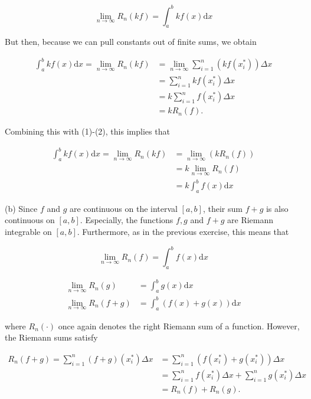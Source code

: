 \documentclass[10pt]{article}
\begin{document}
\begin{equation*}
\lim _{n \rightarrow \infty} R_{n}(k f)=\int_{a}^{b} k f(x) \mathrm{d} x \tag{2}
\end{equation*}


But then, because we can pull constants out of finite sums, we obtain

$$
\begin{aligned}
\int_{a}^{b} k f(x) \mathrm{d} x=\lim _{n \rightarrow \infty} R_{n}(k f) & =\lim _{n \rightarrow \infty} \sum_{i=1}^{n}\left(k f\left(x_{i}^{*}\right)\right) \Delta x \\
& =\sum_{i=1}^{n} k f\left(x_{i}^{*}\right) \Delta x \\
& =k \sum_{i=1}^{n} f\left(x_{i}^{*}\right) \Delta x \\
& =k R_{n}(f) .
\end{aligned}
$$

Combining this with (1)-(2), this implies that

$$
\begin{aligned}
\int_{a}^{b} k f(x) \mathrm{d} x=\lim _{n \rightarrow \infty} R_{n}(k f) & =\lim _{n \rightarrow \infty}\left(k R_{n}(f)\right) \\
& =k \lim _{n \rightarrow \infty} R_{n}(f) \\
& =k \int_{a}^{b} f(x) \mathrm{d} x
\end{aligned}
$$

(b) Since $f$ and $g$ are continuous on the interval $[a, b]$, their sum $f+g$ is also continuous on $[a, b]$. Especially, the functions $f, g$ and $f+g$ are Riemann integrable on $[a, b]$. Furthermore, as in the previous exercise, this means that

$$
\lim _{n \rightarrow \infty} R_{n}(f)=\int_{a}^{b} f(x) \mathrm{d} x
$$

$$
\begin{aligned}
\lim _{n \rightarrow \infty} R_{n}(g) & =\int_{a}^{b} g(x) \mathrm{d} x \\
\lim _{n \rightarrow \infty} R_{n}(f+g) & =\int_{a}^{b}(f(x)+g(x)) \mathrm{d} x
\end{aligned}
$$

where $R_{n}(\cdot)$ once again denotes the right Riemann sum of a function. However, the Riemann sums satisfy

$$
\begin{aligned}
R_{n}(f+g)=\sum_{i=1}^{n}(f+g)\left(x_{i}^{*}\right) \Delta x & =\sum_{i=1}^{n}\left(f\left(x_{i}^{*}\right)+g\left(x_{i}^{*}\right)\right) \Delta x \\
& =\sum_{i=1}^{n} f\left(x_{i}^{*}\right) \Delta x+\sum_{i=1}^{n} g\left(x_{i}^{*}\right) \Delta x \\
& =R_{n}(f)+R_{n}(g) .
\end{aligned}
$$
\end{document}

